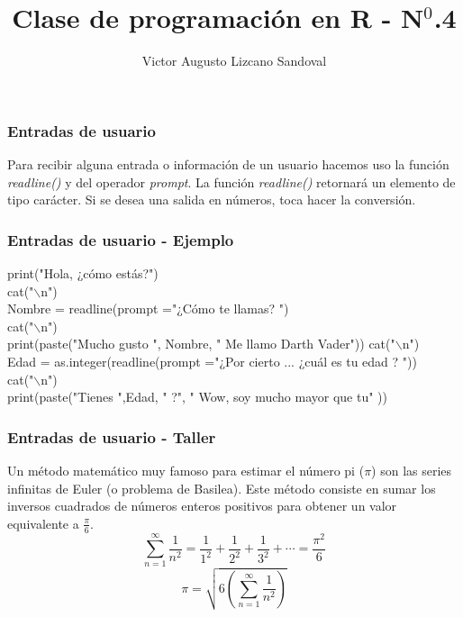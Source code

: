 \documentclass[14pt]{beamer}
\begin{document}
	\author{Victor Augusto Lizcano Sandoval}
	\title{Clase de programación en R - N$^{0}$.4}
	\begin{frame}[plain]
		\maketitle
	\end{frame}
	
	\begin{frame}
		\frametitle{Entradas de usuario}
		Para recibir alguna entrada o información de un usuario hacemos uso  la función \textit{readline()} y del operador \textit{prompt}. La función \textit{readline()} retornará un elemento de tipo carácter. Si se desea una salida en números, toca hacer la conversión.
	\end{frame}

\begin{frame}
	\frametitle{Entradas de usuario - Ejemplo}
	
	print("Hola, ¿cómo estás?")\\
	cat("$\backslash$n")\\
	Nombre = readline(prompt ="¿Cómo te llamas? ")\\
	cat("$\backslash$n")\\
	print(paste("Mucho gusto ", Nombre, " Me llamo Darth Vader"))
	cat("$\backslash$n")\\
	Edad = as.integer(readline(prompt ="¿Por cierto ... ¿cuál es tu edad ? "))\\
	cat("$\backslash$n")\\
	print(paste("Tienes ",Edad, " ?", " Wow, soy mucho mayor que tu" ))
		
\end{frame}

\begin{frame}
	\frametitle{Entradas de usuario - Taller}
	
	Un método matemático muy famoso para estimar el número pi ($\pi$) son las series infinitas de Euler (o problema de Basilea). Este método consiste en sumar los inversos cuadrados de números enteros positivos para obtener un valor equivalente a $\frac{\pi}{6}$.\\
	
	\begin{equation}
	\sum_{n=1}^{\infty} \frac{1}{n^2} = \frac{1}{1^2} + \frac{1}{2^2} + \frac{1}{3^2} + \cdots  = \frac{\pi^2}{6}
	\end{equation}
	\begin{equation}
	\pi =  \sqrt{ 6 \left( \sum_{n=1}^{\infty} \frac{1}{n^2} \right)}
	\end{equation}
	
\end{frame}
\end{document}
